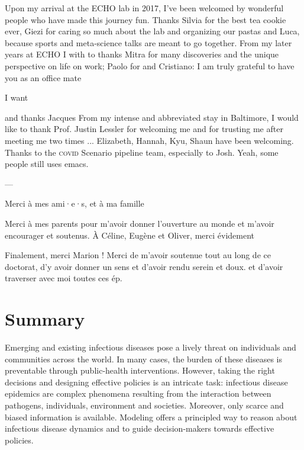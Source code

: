  Upon my arrival at the ECHO lab in 2017, I've been welcomed by wonderful people who have made this journey fun. Thanks Silvia for the best tea cookie ever, Giezi for caring so much about the lab and organizing our pastas and Luca, because sports and meta-science talks are meant to go together. From my later years at ECHO I with to thanks Mitra for many discoveries and the unique perspective on life on work; Paolo for and Cristiano: I am truly grateful to have you as an office mate
 
 I want 
 
 and thanks Jacques
 From my intense and abbreviated stay in Baltimore, I would like to thank Prof. Justin Lessler for welcoming me and for trusting me after meeting me two times ... Elizabeth, Hannah, Kyu, Shaun have been welcoming. Thanks to the \textsc{covid} Scenario pipeline team, especially to Josh.  Yeah, some people still uses emacs.
 
 --- 
 
 Merci à mes ami·e·s, et à ma famille 

Merci à mes parents pour m'avoir donner l'ouverture au monde et m'avoir encourager et soutenus.
À Céline, Eugène et Oliver, merci évidement

Finalement, merci Marion ! Merci de m'avoir soutenue tout au long de ce doctorat, d'y avoir donner un sens et d'avoir rendu  serein et doux. 
 et d'avoir traverser avec moi toutes ces ép.  
 
 \chapter*{Summary} %
\vspace{-.5cm}
Emerging and existing infectious diseases pose a lively threat on individuals and communities across the world. In many cases, the burden of these diseases is preventable through public-health interventions. However, taking the right decisions and designing effective policies is an intricate task: infectious disease epidemics are complex phenomena resulting from the interaction between pathogens, individuals, environment and societies. Moreover, only scarce and biased information is available. Modeling offers a principled way to reason about infectious disease dynamics and to guide decision-makers towards effective policies. 

